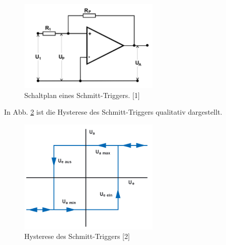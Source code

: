 \documentclass{scrartcl}
\begin{document}
\begin{figure}[!h]
\centering
\includegraphics[width=0.6\textwidth]{schmitt}
\caption{Schaltplan eines Schmitt-Triggers. [1]}
\label{schmitt}
\end{figure}
In Abb. \ref{hyst} ist die Hysterese des Schmitt-Triggers qualitativ dargestellt.
\begin{figure}[!h]
\centering
\includegraphics[width=0.6\textwidth]{hyst.png}
\caption{Hysterese des Schmitt-Triggers [2]}
\label{hyst}
\end{figure}
\FloatBarrier
\end{document}
